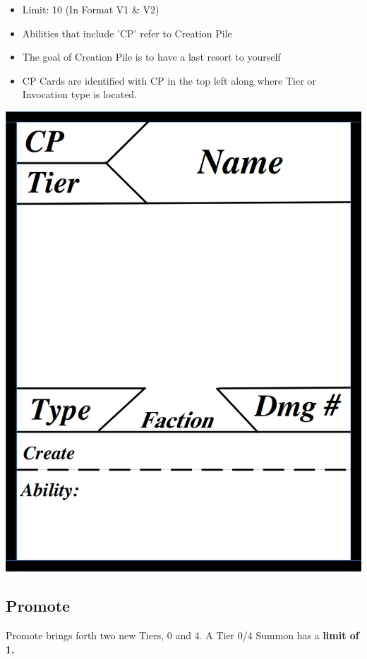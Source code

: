 \documentclass[12pt, letterpaper]{article}
\begin{document}
\begin{itemize}
    \item Limit: 10 (In Format V1 \& V2)
    \item Abilities that include 'CP' refer to Creation Pile
    \item The goal of Creation Pile is to have a last resort to yourself
    \item CP Cards are identified with CP in the top left along where Tier or Invocation type is located. 
\end{itemize}

\begin{center}
    \includegraphics[scale = 0.25]{images/CPCardTemplate.png}
\end{center}

\newpage
\subsection{Promote}
Promote brings forth two new Tiers, 0 and 4. A Tier 0/4 Summon has a \textbf{limit of 1.}
\end{document}
